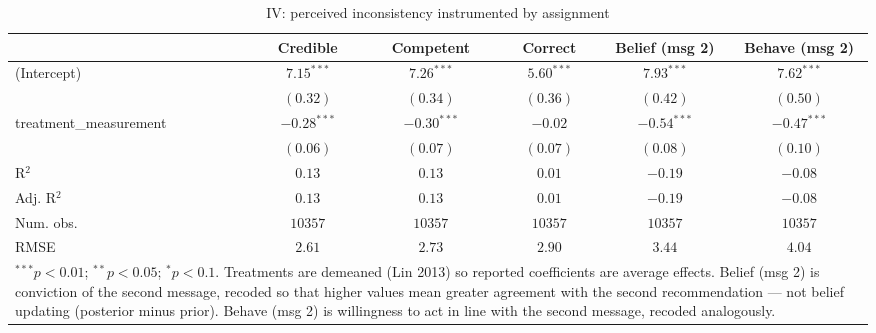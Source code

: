 
\begin{table}
\begin{center}
\begin{tabular}{l c c c c c}
\hline
 & Credible & Competent & Correct & Belief (msg 2) & Behave (msg 2) \\
\hline
(Intercept)            & $7.15^{***}$  & $7.26^{***}$  & $5.60^{***}$ & $7.93^{***}$  & $7.62^{***}$  \\
                       & $(0.32)$      & $(0.34)$      & $(0.36)$     & $(0.42)$      & $(0.50)$      \\
treatment\_measurement & $-0.28^{***}$ & $-0.30^{***}$ & $-0.02$      & $-0.54^{***}$ & $-0.47^{***}$ \\
                       & $(0.06)$      & $(0.07)$      & $(0.07)$     & $(0.08)$      & $(0.10)$      \\
\hline
R$^2$                  & $0.13$        & $0.13$        & $0.01$       & $-0.19$       & $-0.08$       \\
Adj. R$^2$             & $0.13$        & $0.13$        & $0.01$       & $-0.19$       & $-0.08$       \\
Num. obs.              & $10357$       & $10357$       & $10357$      & $10357$       & $10357$       \\
RMSE                   & $2.61$        & $2.73$        & $2.90$       & $3.44$        & $4.04$        \\
\hline
\multicolumn{6}{l}{\scriptsize{\item $^{***}p<0.01$; $^{**}p<0.05$; $^{*}p<0.1$. Treatments are demeaned (Lin 2013) so reported coefficients are average effects. Belief (msg 2) is conviction of the second message, recoded so that higher values mean greater agreement with the second recommendation --- not belief updating (posterior minus prior). Behave (msg 2) is willingness to act in line with the second message, recoded analogously.}}
\end{tabular}
\caption{IV: perceived inconsistency instrumented by assignment}
\label{table:coefficients}
\end{center}
\end{table}

